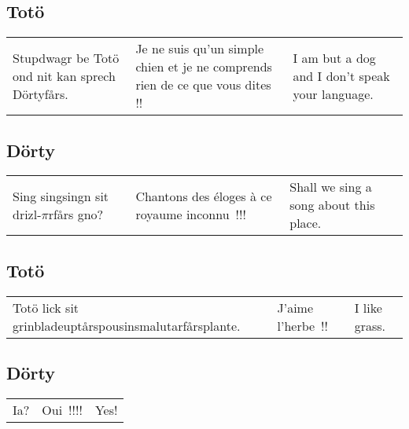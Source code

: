 \subsection*{Totö}
\begin{tabular}{p{3.7cm}|p{3.7cm}|p{3.7cm}}
Stupdwagr be Totö ond nit kan sprech Dörtyfårs.&
Je ne suis qu'un simple chien et je ne comprends rien de ce que vous dites
!!&
I am but a dog and I don't speak your language.
\end{tabular}\par
\subsection*{Dörty}
\begin{tabular}{p{3.7cm}|p{3.7cm}|p{3.7cm}}
Sing singsingn sit drizl-$\pi$rfårs gno?&
Chantons des éloges à ce royaume inconnu~!!!&
Shall we sing a song about this place.
\end{tabular}\par
\subsection*{Totö}
\begin{tabular}{p{3.7cm}|p{3.7cm}|p{3.7cm}}\par
Totö lick sit grin\-blade\-up\-tårs\-pousin\-smal\-utar\-fårs\-plante.&
J'aime l'herbe~!!&
I like grass.
\end{tabular}\par
\subsection*{Dörty}
\begin{tabular}{p{3.7cm}|p{3.7cm}|p{3.7cm}}
Ia?&
Oui~!!!!&
Yes!
\end{tabular}\par
